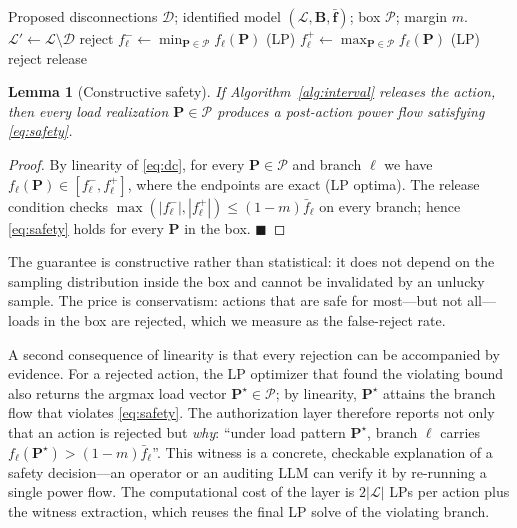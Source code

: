 \documentclass[journal]{IEEEtran}
\newtheorem{lemma}{Lemma}
\begin{document}
\begin{algorithm}
\caption{Interval authorization of a proposed action}
\label{alg:interval}
\begin{algorithmic}
\REQUIRE Proposed disconnections $\mathcal{D}$; identified model
$(\mathcal{L}, \mathbf{B}, \bar{\mathbf{f}})$; box $\mathcal{P}$; margin $m$.
\STATE $\mathcal{L}' \leftarrow \mathcal{L} \setminus \mathcal{D}$
  \RETURN reject
\ENDIF
{}
  \STATE $f_\ell^- \leftarrow \min_{\mathbf{P}\in\mathcal{P}} f_\ell(\mathbf{P})$
  \quad (LP)
  \STATE $f_\ell^+ \leftarrow \max_{\mathbf{P}\in\mathcal{P}} f_\ell(\mathbf{P})$
  \quad (LP)
    \RETURN reject
  \ENDIF
\ENDFOR
\RETURN release
\end{algorithmic}
\end{algorithm}

\begin{lemma}[Constructive safety]
\label{lem:safety}
If Algorithm~\ref{alg:interval} releases the action, then every load realization
$\mathbf{P} \in \mathcal{P}$ produces a post-action power flow satisfying
\eqref{eq:safety}.
\end{lemma}
\begin{proof}
By linearity of \eqref{eq:dc}, for every $\mathbf{P}\in\mathcal{P}$ and branch
$\ell$ we have $f_\ell(\mathbf{P}) \in [f_\ell^-, f_\ell^+]$, where the endpoints
are exact (LP optima). The release condition checks
$\max(|f_\ell^-|, |f_\ell^+|) \le (1-m)\bar f_\ell$ on every branch; hence
\eqref{eq:safety} holds for every $\mathbf{P}$ in the box. \hfill$\blacksquare$
\end{proof}

The guarantee is constructive rather than statistical: it does not depend on the
sampling distribution inside the box and cannot be invalidated by an unlucky
sample. The price is conservatism: actions that are safe for most---but not
all---loads in the box are rejected, which we measure as the false-reject rate.

A second consequence of linearity is that every rejection can be accompanied by
evidence. For a rejected action, the LP optimizer that found the violating bound
also returns the argmax load vector $\mathbf{P}^\star \in \mathcal{P}$; by
linearity, $\mathbf{P}^\star$ attains the branch flow that violates
\eqref{eq:safety}. The authorization layer therefore reports not only that an
action is rejected but \emph{why}: ``under load pattern $\mathbf{P}^\star$,
branch $\ell$ carries $f_\ell(\mathbf{P}^\star) > (1-m)\bar f_\ell$''. This
witness is a concrete, checkable explanation of a safety decision---an operator
or an auditing LLM can verify it by re-running a single power flow. The
computational cost of the layer is $2|\mathcal{L}|$ LPs per action plus the
witness extraction, which reuses the final LP solve of the violating branch.
\end{document}
